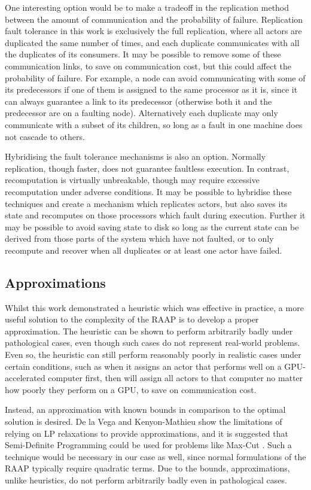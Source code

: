 One interesting option would be to make a tradeoff in the replication method between the amount of communication and the probability of failure.
Replication fault tolerance in this work is exclusively the full replication, where all actors are duplicated the same number of times, and each duplicate communicates with all the duplicates of its consumers.
It may be possible to remove some of these communication links, to save on communication cost, but this could affect the probability of failure.
For example, a node can avoid communicating with some of its predecessors if one of them is assigned to the same processor as it is, since it can always guarantee a link to its predecessor (otherwise both it and the predecessor are on a faulting node).
Alternatively each duplicate may only communicate with a subset of its children, so long as a fault in one machine does not cascade to others.

Hybridising the fault tolerance mechanisms is also an option.
Normally replication, though faster, does not guarantee faultless execution.
In contrast, recomputation is virtually unbreakable, though may require excessive recomputation under adverse conditions.
It may be possible to hybridise these techniques and create a mechanism which replicates actors, but also saves its state and recomputes on those processors which fault during execution.
Further it may be possible to avoid saving state to disk so long as the current state can be derived from those parts of the system which have not faulted, or to only recompute and recover when all duplicates or at least one actor have failed.

\subsection{Approximations}

Whilst this work demonstrated a heuristic which was effective in practice, a more useful solution to the complexity of the RAAP is to develop a proper approximation.
The heuristic can be shown to perform arbitrarily badly under pathological cases, even though such cases do not represent real-world problems.
Even so, the heuristic can still perform reasonably poorly in realistic cases under certain conditions, such as when it assigns an actor that performs well on a GPU-accelerated computer first, then will assign all actors to that computer no matter how poorly they perform on a GPU, to save on communication cost.

Instead, an approximation with known bounds in comparison to the optimal solution is desired.
De la Vega and Kenyon-Mathieu show the limitations of relying on LP relaxations to provide approximations, and it is suggested that Semi-Definite Programming could be used for problems like Max-Cut \cite{fer07}.
Such a technique would be necessary in our case as well, since normal formulations of the RAAP typically require quadratic terms.
Due to the bounds, approximations, unlike heuristics, do not perform arbitrarily badly even in pathological cases.

